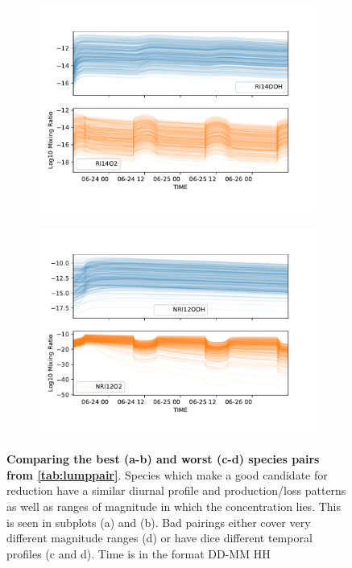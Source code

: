 \begin{figure}[H]
\begin{subfigure}[t]{.5\textwidth}
  \centering
  \includegraphics[width=\textwidth]{ensemble/RI14OOH-RI14O2.pdf}
  \caption{}
\end{subfigure}%
\begin{subfigure}[t]{.5\textwidth}
  \centering
  \includegraphics[width=\textwidth]{ensemble/NRI12OOH-NRI12O2.pdf}
  \caption{}
\end{subfigure}%
\caption{\textbf{Comparing the best (a-b) and worst (c-d) species pairs from \autoref{tab:lumppair}}. Species which make a good candidate for reduction have a similar diurnal profile and production/loss patterns as well as ranges of magnitude in which the concentration lies. This is seen in subplots (a) and (b). Bad pairings either cover very different magnitude ranges (d) or have dice different temporal profiles (c and d). Time is in the format DD-MM HH}
\label{fig:lumppair}
\end{figure}





